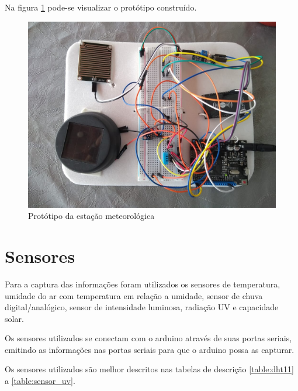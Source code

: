 Na figura \ref{fig:arduino_prototipo} pode-se visualizar o protótipo construído.

\begin{figure}[H]
    \centering
    \caption{Protótipo da estação meteorológica \label{fig:arduino_prototipo}}
    \includegraphics[scale=0.4]{arduino_prototipo.jpeg}
    \hfill
{}
\end{figure}

\section{Sensores}
\label{sec:sensores}

Para a captura das informações foram utilizados os sensores de temperatura, umidade do ar com temperatura em relação a umidade, sensor de chuva digital/analógico, sensor de intensidade luminosa, radiação UV e capacidade solar.

Os sensores utilizados se conectam com o arduino através de suas portas seriais, emitindo as informações nas portas seriais para que o arduino possa as capturar.

Os sensores utilizados são melhor descritos nas tabelas de descrição \ref{table:dht11} a \ref{table:sensor_uv}.

